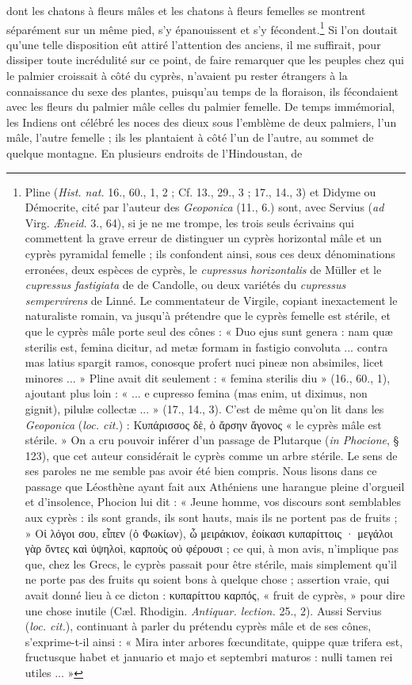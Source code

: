 \documentclass{article}
\begin{document}
dont les chatons à fleurs mâles et les chatons à fleurs femelles se montrent séparément sur un même pied, s'y épanouissent et s'y fécondent.\footnote{Pline (\emph{Hist. nat.} 16., 60., 1, 2 ; Cf. 13., 29., 3 ; 17., 14., 3) et Didyme ou Démocrite, cité par l'auteur des \emph{Geoponica} (11., 6.) sont, avec Servius (\emph{ad} Virg. \emph{Æneid.} 3., 64), si je ne me trompe, les trois seuls écrivains qui commettent la grave erreur de distinguer un cyprès horizontal mâle et un cyprès pyramidal femelle ; ils confondent ainsi, sous ces deux dénominations erronées, deux espèces de cyprès, le \emph{cupressus horizontalis} de Müller et le \emph{cupressus fastigiata} de de Candolle, ou deux variétés du \emph{cupressus sempervirens} de Linné. Le commentateur de Virgile, copiant inexactement le naturaliste romain, va jusqu'à prétendre que le cyprès femelle est stérile, et que le cyprès mâle porte seul des cônes : « Duo ejus sunt genera : nam quæ sterilis est, femina dicitur, ad metæ formam in fastigio convoluta ... contra mas latius spargit ramos, conosque profert nuci pineæ non absimiles, licet minores ... » Pline avait dit seulement : « femina sterilis diu » (16., 60., 1), ajoutant plus loin : « ... e cupresso femina (mas enim, ut diximus, non gignit), pilulæ collectæ ... » (17., 14., 3). C'est de même qu'on lit dans les \emph{Geoponica} (\emph{loc. cit.}) : \textgreek{Κυπάρισσος δὲ, ὁ ἄρσην ἄγονος} « le cyprès mâle est stérile. » On a cru pouvoir inférer d'un passage de Plutarque (\emph{in Phocione}, § 123), que cet auteur considérait le cyprès comme un arbre stérile. Le sens de ses paroles ne me semble pas avoir été bien compris. Nous lisons dans ce passage que Léosthène ayant fait aux Athéniens une harangue pleine d'orgueil et d'insolence, Phocion lui dit : « Jeune homme, vos discours sont semblables aux cyprès : ils sont grands, ils sont hauts, mais ils ne portent pas de fruits ; » \textgreek{Οἱ λόγοι σου, εἶπεν} (\textgreek{ὁ Φωκίων}), \textgreek{ὦ μειράκιον, ἐοίκασι κυπαρίττοις · μεγάλοι γὰρ ὄντες καὶ ὑψηλοὶ, καρποὺς οὐ φέρουσι} ; ce qui, à mon avis, n'implique pas que, chez les Grecs, le cyprès passait pour être stérile, mais simplement qu'il ne porte pas des fruits qu soient bons à quelque chose ; assertion vraie, qui avait donné lieu à ce dicton : \textgreek{κυπαρίττου καρπός}, « fruit de cyprès, » pour dire une chose inutile (Cæl. Rhodigin. \emph{Antiquar. lection.} 25., 2). Aussi Servius (\emph{loc. cit.}), continuant à parler du prétendu cyprès mâle et de ses cônes, s'exprime-t-il ainsi : « Mira inter arbores fœcunditate, quippe quæ trifera est, fructusque habet et januario et majo et septembri maturos : nulli tamen rei utiles ... »} Si l'on doutait qu'une telle disposition eût attiré l'attention des anciens, il me suffirait, pour dissiper toute incrédulité sur ce point, de faire remarquer que les peuples chez qui le palmier croissait à côté du cyprès, n'avaient pu rester étrangers à la connaissance du sexe des plantes, puisqu'au temps de la floraison, ils fécondaient avec les fleurs du palmier mâle celles du palmier femelle. De temps immémorial, les Indiens ont célébré les noces des dieux sous l'emblème de deux palmiers, l'un mâle, l'autre femelle ; ils les plantaient à côté l'un de l'autre, au sommet de quelque montagne. En plusieurs endroits de l'Hindoustan, de 
\end{document}
